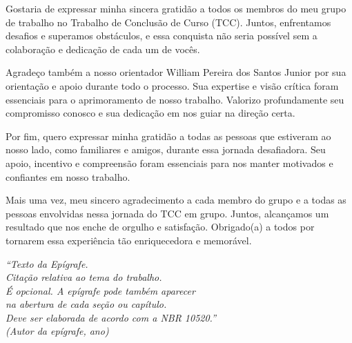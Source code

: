 \begin{agradecimentos}
	Gostaria de expressar minha sincera gratidão a todos os membros do meu grupo de trabalho no Trabalho de Conclusão de Curso (TCC). Juntos, enfrentamos desafios e superamos obstáculos, e essa conquista não seria possível sem a colaboração e dedicação de cada um de vocês. 

	Agradeço também a nosso orientador William Pereira dos Santos Junior por sua orientação e apoio durante todo o processo. Sua expertise e visão crítica foram essenciais para o aprimoramento de nosso trabalho. Valorizo profundamente seu compromisso conosco e sua dedicação em nos guiar na direção certa.

	Por fim, quero expressar minha gratidão a todas as pessoas que estiveram ao nosso lado, como familiares e amigos, durante essa jornada desafiadora. Seu apoio, incentivo e compreensão foram essenciais para nos manter motivados e confiantes em nosso trabalho.

	Mais uma vez, meu sincero agradecimento a cada membro do grupo e a todas as pessoas envolvidas nessa jornada do TCC em grupo. Juntos, alcançamos um resultado que nos enche de orgulho e satisfação. Obrigado(a) a todos por tornarem essa experiência tão enriquecedora e memorável.
	
\end{agradecimentos}

\begin{epigrafe}
	\vspace*{\fill}
	\begin{flushright}
		\textit{``Texto da Epígrafe.\\
			Citação relativa ao tema do trabalho.\\
			É opcional. A epígrafe pode também aparecer\\
			na abertura de cada seção ou capítulo.\\
			Deve ser elaborada de acordo com a NBR 10520.''\\
			(Autor da epígrafe, ano)}
	\end{flushright}
\end{epigrafe}


